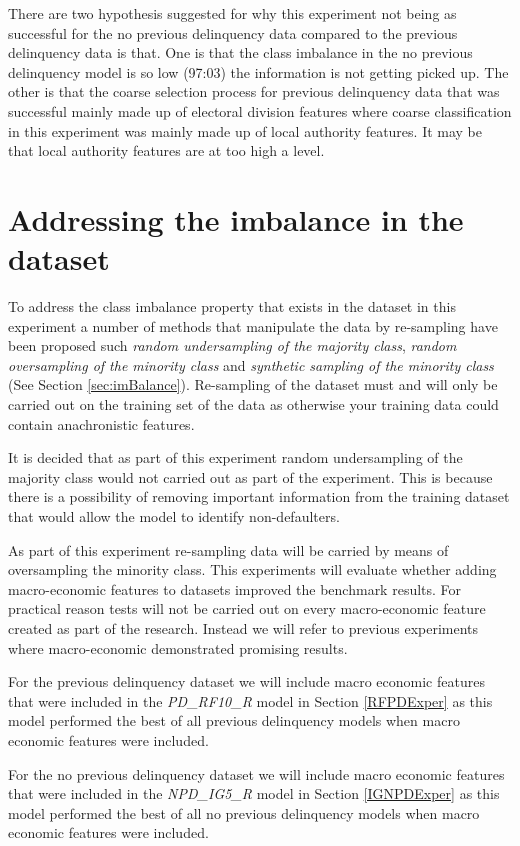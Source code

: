There are two hypothesis suggested for why this experiment not being as successful for the no previous delinquency data compared to the previous delinquency data is that. One is that the class imbalance in the no previous delinquency model is so low (97:03) the information is not getting picked up. The other is that the coarse selection process for previous delinquency data that was successful mainly made up of electoral division features where coarse classification in this experiment was mainly made up of local authority features. It may be that local authority features are at too high a level. 

\section{Addressing the imbalance in the dataset}
To address the class imbalance property that exists in the dataset in this experiment a number of methods that manipulate the data by re-sampling have been proposed such \textit{random undersampling of the majority class}, \textit{random oversampling of the minority class} and \textit{synthetic sampling of the minority class} (See Section \ref{sec:imBalance}). Re-sampling of the dataset must and will only be carried out on the training set of the data as otherwise your training data could contain anachronistic features.

It is decided that as part of this experiment random undersampling of the majority class would not carried out as part of the experiment. This is because there is a possibility of removing important information from the training dataset that would allow the model to identify non-defaulters.

As part of this experiment re-sampling data will be carried by means of oversampling the minority class. This experiments will evaluate whether adding macro-economic features to datasets improved the benchmark results. For practical reason tests will not be carried out on every macro-economic feature created as part of the research. Instead we will refer to previous experiments where macro-economic demonstrated promising results. 

For the previous delinquency dataset we will include macro economic features that were included in the \textit{PD\_RF10\_R} model in Section \ref{RFPDExper} as this model performed the best of all previous delinquency models when macro economic features were included.

For the no previous delinquency dataset we will include macro economic features that were included in the \textit{NPD\_IG5\_R} model in Section \ref{IGNPDExper} as this model performed the best of all no previous delinquency models when macro economic features were included. 

